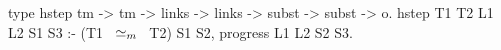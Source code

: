\begin{elpicode}
type hstep tm -> tm -> links -> links -> subst -> subst -> o.
hstep T1 T2 L1 L2 S1 S3 :-
  (T1 ~$\simeq_m$~ T2) S1 S2,
  progress L1 L2 S2 S3.
\end{elpicode}
